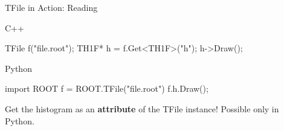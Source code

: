 \documentclass[aspectratio=169]{beamer}
\begin{document}
\begin{frame}[fragile]{TFile in Action: Reading}
        \begin{block}{C++}
            \begin{myterminal}
TFile f("file.root");
TH1F* h = f.Get<TH1F>("h");
h->Draw();
            \end{myterminal}
        \end{block}
        \begin{block}{Python}
            \begin{myterminal}
import ROOT
f = ROOT.TFile("file.root")
f.h.Draw();
            \end{myterminal}
        \end{block}
        Get the histogram as an \textbf{attribute} of the TFile instance! Possible only in Python.
\end{frame}
\end{document}
